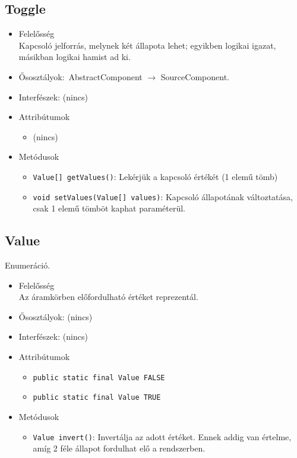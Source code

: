 \subsection{Toggle}
\begin{itemize}
\item Felelősség\\
Kapcsoló jelforrás, melynek két állapota lehet; egyikben logikai igazat, másikban logikai hamist ad ki.
\item Ősosztályok:\ AbstractComponent $\rightarrow{}$ SourceComponent.
\item Interfészek: (nincs)
\item Attribútumok $\ $
\begin{itemize}
\item (nincs)
\end{itemize}
\item Metódusok$\ $
\begin{itemize}
	\item \texttt{Value[] getValues()}: Lekérjük a kapcsoló értékét (1 elemű tömb)
	\item \texttt{void setValues(Value[] values)}: Kapcsoló állapotának változtatása, csak 1 elemű tömböt kaphat paraméterül.
\end{itemize}
\end{itemize}

\subsection{Value}
Enumeráció.
\begin{itemize}
\item Felelősség\\
Az áramkörben előfordulható értéket reprezentál.
\item Ősosztályok: (nincs)
\item Interfészek: (nincs)
\item Attribútumok $\ $
\begin{itemize}
	\item \texttt{public static final Value FALSE} 
	\item \texttt{public static final Value TRUE} 
\end{itemize}
\item Metódusok$\ $
\begin{itemize}
	\item \texttt{Value invert()}: Invertálja az adott értéket. Ennek addig van értelme, amíg 2 féle  állapot fordulhat elő a rendszerben.
\end{itemize}
\end{itemize}

